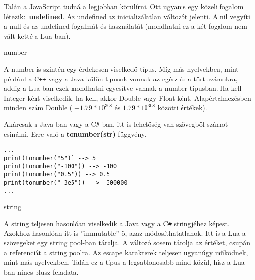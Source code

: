 Talán a JavaScript tudná a legjobban körülírni. Ott ugyanis egy közeli fogalom létezik:~\mbox{\textbf{undefined}}. Az undefined az inicializálatlan változót jelenti. A nil vegyíti a null és az undefined fogalmát és használatát (mondhatni ez a két fogalom nem vált ketté a Lua-ban).


 \bigskip
 
 \Large number \normalsize
 
 \bigskip

A number is szintén egy érdekesen viselkedő típus. Míg más nyelvekben, mint például a C\verb|++| vagy a Java külön típusok vannak az egész és a tört számokra, addig a Lua-ban ezek mondhatni egyesítve vannak a number típusban. Ha kell Integer-ként viselkedik, ha kell, akkor Double vagy Float-ként. Alapértelmezésben minden szám Double ( $ -1.79 * 10^{308}$ és $ 1.79 * 10^{308}$ közötti értékek). 

Akárcsak a Java-ban vagy a C\verb|#|-ban, itt is lehetőség van szövegből számot csinálni. Erre való a \textbf{tonumber(str)} függvény.
\scriptsize
\begin{lstlisting}
...
print(tonumber("5")) --> 5
print(tonumber("-100")) --> -100
print(tonumber("0.5")) --> 0.5
print(tonumber("-3e5")) --> -300000
...
\end{lstlisting}
\normalsize

 \bigskip

\Large string \normalsize

\bigskip

A string teljesen hasonlóan viselkedik a Java vagy a C\verb|#| stringjéhez képest. Azokhoz hasonlóan itt is ''immutable''-ö, azaz módosíthatatlanok. Itt is a Lua a szövegeket egy string pool-ban tárolja. A változó sosem tárolja az értéket, csupán a referenciát a string poolra. Az escape karakterek teljesen ugyanúgy működnek, mint más nyelvekben. Talán ez a típus a legsablonosabb mind közül, hisz a Lua-ban nincs plusz feladata.

